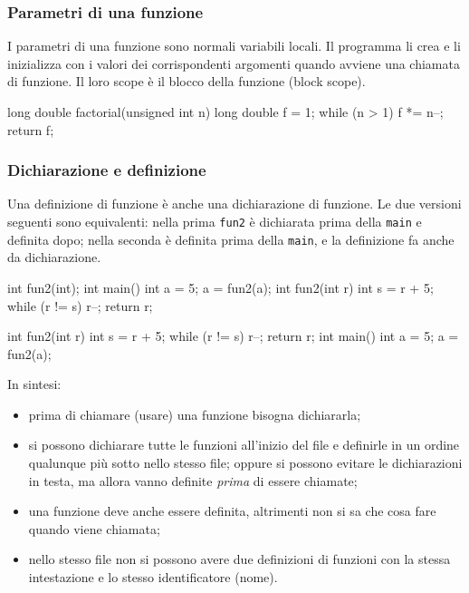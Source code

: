 \documentclass[11pt,a4paper]{article}
\begin{document}
\subsubsection{Parametri di una funzione}

I parametri di una funzione sono normali variabili locali. Il programma li crea e li inizializza con i valori dei corrispondenti argomenti quando avviene una chiamata di funzione. Il loro scope è il blocco della funzione (block scope).
\begin{codice}
long double factorial(unsigned int n)
{
    long double f = 1;
    while (n > 1)
        f *= n--;
    return f;
}
\end{codice}

\subsubsection{Dichiarazione e definizione}

Una definizione di funzione è anche una dichiarazione di funzione. Le due versioni seguenti sono equivalenti: nella prima \lstinline|fun2| è dichiarata prima della \lstinline|main| e definita dopo; nella seconda è definita prima della \lstinline|main|, e la definizione fa anche da dichiarazione.
\begin{codice}
int fun2(int);
int main() {
    int a = 5;
    a = fun2(a);
}
int fun2(int r) {
    int s = r + 5;
    while (r != s)
        r--;
    return r;
}
\end{codice}
\begin{codice}
int fun2(int r) {
    int s = r + 5;
    while (r != s)
        r--;
    return r;
}
int main() {
    int a = 5;
    a = fun2(a);
}
\end{codice}

In sintesi:
\begin{itemize}
    \item prima di chiamare (usare) una funzione bisogna dichiararla;
    \item si possono dichiarare tutte le funzioni all'inizio del file e definirle in un ordine qualunque più sotto nello stesso file; oppure si possono evitare le dichiarazioni in testa, ma allora vanno definite \emph{prima} di essere chiamate;
    \item una funzione deve anche essere definita, altrimenti non si sa che cosa fare quando viene chiamata;
    \item nello stesso file non si possono avere due definizioni di funzioni con la stessa intestazione e lo stesso identificatore (nome).
\end{itemize}
\end{document}
